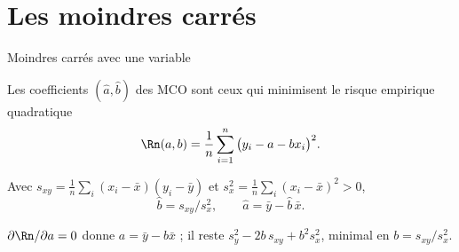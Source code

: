 \documentclass[aspectratio=169,11pt]{beamer}
\begin{document}
\section{Les moindres carrés}

\begin{frame}{Moindres carrés avec une variable}
  \small
  \begin{definition}
    Les coefficients $(\hat a,\hat b)$ des MCO sont ceux qui minimisent le risque empirique quadratique
    \[
      \Rn(a,b)=\frac1n\sum_{i=1}^n\big(y_i-a-bx_i\big)^2 .
    \]
  \end{definition}
  \begin{proposition}
    Avec $s_{xy}=\frac1n\sum_i(x_i-\bar x)(y_i-\bar y)$ et $s_x^2=\frac1n\sum_i(x_i-\bar x)^2>0$,
    \[
      \hat b=s_{xy}/s_x^2,\qquad \hat a=\bar y-\hat b\,\bar x .
    \]
  \end{proposition}
  \begin{preuve}[(rappel)]
    $\partial\Rn/\partial a=0$ donne $a=\bar y-b\bar x$ ; il reste $s_y^2-2b\,s_{xy}+b^2s_x^2$, minimal en $b=s_{xy}/s_x^2$.
  \end{preuve}
\end{frame}
\end{document}
